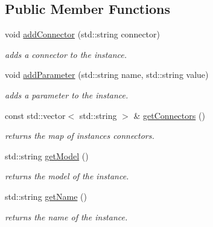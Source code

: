 \subsection*{Public Member Functions}
\begin{DoxyCompactItemize}
\item 
void \mbox{\hyperlink{class_s_p_i_c_e_1_1_instance_af9aeca34e780851a2b024df7c5ff5b54}{add\+Connector}} (std\+::string connector)
\begin{DoxyCompactList}\small\item\em adds a connector to the instance. \end{DoxyCompactList}\item 
void \mbox{\hyperlink{class_s_p_i_c_e_1_1_instance_a8d69bbbea5ece0949e100c464e412f20}{add\+Parameter}} (std\+::string name, std\+::string value)
\begin{DoxyCompactList}\small\item\em adds a parameter to the instance. \end{DoxyCompactList}\item 
const std\+::vector$<$ std\+::string $>$ \& \mbox{\hyperlink{class_s_p_i_c_e_1_1_instance_acce8940edeaa3d79c522006f987e0711}{get\+Connectors}} ()
\begin{DoxyCompactList}\small\item\em returns the map of instance\textquotesingle{}s connectors. \end{DoxyCompactList}\item 
\mbox{\label{class_s_p_i_c_e_1_1_instance_afc74cbe93df9c473a53db83a325f8f9d}} 
std\+::string \mbox{\hyperlink{class_s_p_i_c_e_1_1_instance_afc74cbe93df9c473a53db83a325f8f9d}{get\+Model}} ()
\begin{DoxyCompactList}\small\item\em returns the model of the instance. \end{DoxyCompactList}\item 
\mbox{\label{class_s_p_i_c_e_1_1_instance_ac0fc966d4386ddb71d99361e3fccb311}} 
std\+::string \mbox{\hyperlink{class_s_p_i_c_e_1_1_instance_ac0fc966d4386ddb71d99361e3fccb311}{get\+Name}} ()
\begin{DoxyCompactList}\small\item\em returns the name of the instance. \end{DoxyCompactList}\item 
\mbox{\label{class_s_p_i_c_e_1_1_instance_aee7d59083b78d31ac5c19ab508da91e0}} 

\end{DoxyCompactItemize}
